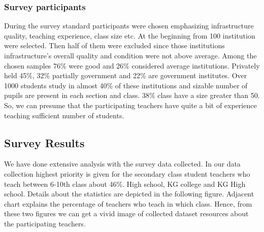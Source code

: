\documentclass[sn-mathphys,Numbered]{sn-jnl}%
\theoremstyle{thmstyleone}%
\theoremstyle{thmstyletwo}%
\theoremstyle{thmstylethree}%
\begin{document}
\subsubsection{Survey participants}
During the survey standard participants were chosen emphasizing infrastructure quality, teaching experience, class size etc. At the beginning from 100 institution were selected. Then half of them were excluded since those institutions infrastructure's overall quality and condition were not above average. Among the chosen samples 76\% were good and 26\% considered average institutions. Privately held 45\%, 32\% partially government and 22\% are government institutes.  Over 1000 students study in almost 40\% of these institutions and  sizable number of pupils are present in each section and class. 38\% class have a size greater than 50. So, we can presume that the participating teachers have quite a bit of experience teaching sufficient number of students.  
\subsection{Survey Results}
We have done extensive analysis with the survey data collected. In our data collection highest priority is given for the secondary class student teachers who teach between 6-10th class about 46\%. High school, KG college and KG High school. Details about the statistics are depicted in the following figure. Adjacent chart explains the percentage of teachers who teach in which class. Hence, from these two figures we can get a vivid image of collected dataset resources about the participating teachers. 
\end{document}
